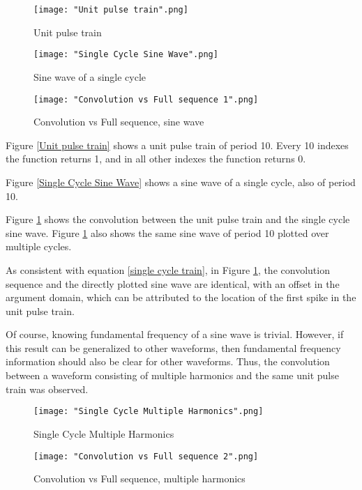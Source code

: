 \documentclass[12pt]{article}
\begin{document}
\begin{figure}[H]
    \texttt{[image: "Unit pulse train".png]}
    \caption{Unit pulse train}\label{Unit pulse train}
    \endminipage\hfill
    \texttt{[image: "Single Cycle Sine Wave".png]}
    \caption{Sine wave of a single cycle}\label{Single Cycle Sine Wave}
    \endminipage\hfill
    \texttt{[image: "Convolution vs Full sequence 1".png]}
    \caption{Convolution vs Full sequence, sine wave}\label{Convolution vs Full sequence 1}
    \endminipage\hfill
\end{figure}

Figure \ref{Unit pulse train} shows a unit pulse train of period 10. Every 10 indexes the function returns 1, and in all other indexes the function returns 0.\newline

Figure \ref{Single Cycle Sine Wave} shows a sine wave of a single cycle, also of period 10.\newline

Figure \ref{Convolution vs Full sequence 1} shows the convolution between the unit pulse train and the single cycle sine wave. Figure \ref{Convolution vs Full sequence 1} also shows the same sine wave of period 10 plotted over multiple cycles.\newline

As consistent with equation \ref{single cycle train}, in Figure \ref{Convolution vs Full sequence 1}, the convolution sequence and the directly plotted sine wave are identical, with an offset in the argument domain, which can be attributed to the location of the first spike in the unit pulse train.\newline

Of course, knowing fundamental frequency of a sine wave is trivial. However, if this result can be generalized to other waveforms, then fundamental frequency information should also be clear for other waveforms. Thus, the convolution between a waveform consisting of multiple harmonics and the same unit pulse train was observed.

\begin{figure}[H]
    \texttt{[image: "Single Cycle Multiple Harmonics".png]}
    \caption{Single Cycle Multiple Harmonics}\label{Single Cycle Multiple Harmonics}
    \endminipage\hfill
    \texttt{[image: "Convolution vs Full sequence 2".png]}
    \caption{Convolution vs Full sequence, multiple harmonics}\label{Convolution vs Full sequence 2}
    \endminipage\hfill
\end{figure}
\end{document}
